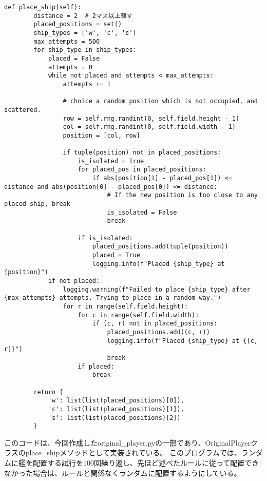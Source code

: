 \documentclass[a4paper,10pt]{ltjsarticle}
\begin{document}
\begin{verbatim}
def place_ship(self):
        distance = 2  # 2マス以上離す
        placed_positions = set()
        ship_types = ['w', 'c', 's']
        max_attempts = 500
        for ship_type in ship_types:
            placed = False
            attempts = 0
            while not placed and attempts < max_attempts:
                attempts += 1

                # choice a random position which is not occupied, and scattered.
                row = self.rng.randint(0, self.field.height - 1)
                col = self.rng.randint(0, self.field.width - 1)
                position = [col, row]

                if tuple(position) not in placed_positions:
                    is_isolated = True
                    for placed_pos in placed_positions:
                        if abs(position[1] - placed_pos[1]) <= distance and abs(position[0] - placed_pos[0]) <= distance:
                            # If the new position is too close to any placed ship, break
                            is_isolated = False
                            break
                    
                    if is_isolated:
                        placed_positions.add(tuple(position))
                        placed = True
                        logging.info(f"Placed {ship_type} at {position}")
            if not placed:
                logging.warning(f"Failed to place {ship_type} after {max_attempts} attempts. Trying to place in a random way.")
                for r in range(self.field.height):
                    for c in range(self.field.width):
                        if (c, r) not in placed_positions:
                            placed_positions.add((c, r))
                            logging.info(f"Placed {ship_type} at {[c, r]}")
                            break
                    if placed:
                        break

        return {
            'w': list(list(placed_positions)[0]),
            'c': list(list(placed_positions)[1]),
            's': list(list(placed_positions)[2])
        }
\end{verbatim}

このコードは、今回作成したoriginal\_player.pyの一部であり、OriginalPlayerクラスのplace\_shipメソッドとして実装されている。
このプログラムでは、ランダムに艦を配置する試行を100回繰り返し、先ほど述べたルールに従って配置できなかった場合は、ルールと関係なくランダムに配置するようにしている。



\printbibliography
\end{document}
